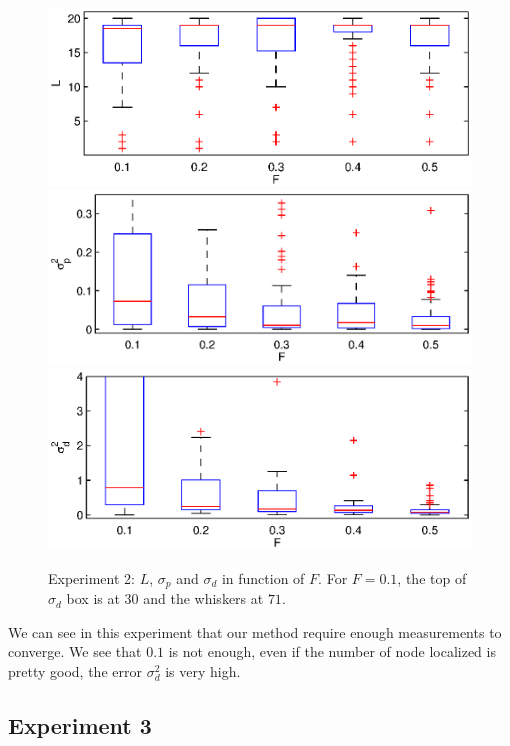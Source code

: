 \documentclass[letterpaper, 10 pt, conference]{ieeeconf}  %
\begin{document}
\begin{figure}[ht!]
\centering
\includegraphics[width=1\columnwidth]{set2-L-nosrf.eps}
\includegraphics[width=1\columnwidth]{set2-sp-nosrf-ylim.eps}
\includegraphics[width=1\columnwidth]{set2-sd-nosrf-ylim.eps}
\caption{\label{figure:set2}Experiment 2: $L$, $\sigma_p$ and $\sigma_d$ in function of $F$. For $F=0.1$, the top of $\sigma_d$ box is at $30$ and the whiskers at $71$.}
\end{figure}

We can see in this experiment that our method require enough measurements to converge. We see that $0.1$ is not enough, even if the number of node localized is pretty good, the error $\sigma_d^2$ is very high.

\subsection{Experiment 3}
\end{document}
